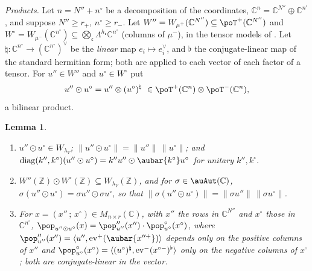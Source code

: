 \documentclass[10pt]{amsart}
\newtheorem{lemma}[theorem]{Lemma}
\theoremstyle{definition}
\theoremstyle{remark}
\newcommand{\C}{\mathbb C}
\newcommand{\Z}{\mathbb Z}
\begin{document}
\emph{Products.} Let $n=N''+n^\circ$ be a decomposition of the coordinates, $\C^n=\C^{N''}\oplus
\C^{n^\circ}$, and suppose $N''\ge r_+$, $n^\circ\ge r_-$. Let $W''=W_{\mu^+}(\C^{N''})\subseteq
\poT^+(\C^{N''})$ and $W^\circ=W_{\mu^-}(\C^{n^\circ})\subseteq\bigotimes_{\mathfrak c}\Lambda^{
h_{\mathfrak c}}\C^{n^\circ}$ (columns of $\mu^-$), in the tensor models of {\cite[\S5.2.6]{P49}}.
Let $\natural\colon\C^{n^\circ}\to(\C^{n^\circ})^\vee$ be the \emph{linear} map $e_i\mapsto
e_i^\vee$, and $\flat$ the conjugate-linear map of the standard hermitian form; both are applied
to each vector of each factor of a tensor. For $u''\in W''$ and $u^\circ\in W^\circ$ put
\[
u''\odot u^\circ=u''\otimes(u^\circ)^\natural\ \in\poT^+(\C^n)\otimes\poT^-(\C^n),
\]
a bilinear product.

\begin{lemma}\label{po:prod}
\begin{enumerate}
\item[(M1)] $u''\odot u^\circ\in W_{\lambda_V}$; $\|u''\odot u^\circ\|=\|u''\|\,\|u^\circ\|$; and
$\operatorname{diag}(k'',k^\circ)(u''\odot u^\circ)=k''u''\odot\aubar{k^\circ}u^\circ$ for unitary
$k'',k^\circ$.
\item[(M2)] $W''(\Z)\odot W^\circ(\Z)\subseteq W_{\lambda_V}(\Z)$, and for $\sigma\in\auAut(\C)$,
$\sigma(u''\odot u^\circ)=\sigma u''\odot\sigma u^\circ$, so that
$\|\sigma(u''\odot u^\circ)\|=\|\sigma u''\|\,\|\sigma u^\circ\|$.
\item[(M3)] For $x=(x''\,;\,x^\circ)\in M_{n\times r}(\C)$, with $x''$ the rows in $\C^{N''}$ and
$x^\circ$ those in $\C^{n^\circ}$, $\pop_{u''\odot u^\circ}(x)=\pop''_{u''}(x'')\cdot
\pop^\circ_{u^\circ}(x^\circ)$, where $\pop''_{u''}(x'')=\langle u'',\mathrm{ev}^+(\aubar{x''^+})
\rangle$ depends only on the positive columns of $x''$ and $\pop^\circ_{u^\circ}(x^\circ)=\langle
(u^\circ)^\natural,\mathrm{ev}^-(x^{\circ-})^\flat\rangle$ only on the negative columns of
$x^\circ$; both are conjugate-linear in the vector.
\end{enumerate}
\end{lemma}
\end{document}
